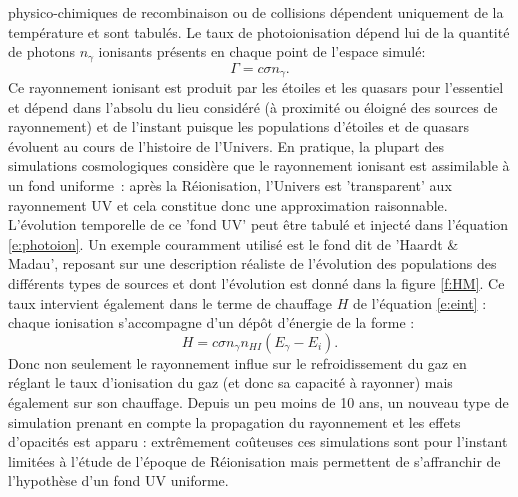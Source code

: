 physico-chimiques de recombinaison ou de collisions dépendent uniquement de la température et sont tabulés. Le taux de photoionisation dépend lui de la quantité de photons $n_\gamma$ ionisants présents en chaque point de l'espace simulé:
\begin{equation}
\Gamma=c\sigma n_\gamma.
\label{e:photoion}
\end{equation}
Ce rayonnement ionisant est produit par les étoiles et les quasars pour l'essentiel et dépend dans l'absolu du lieu considéré (à proximité ou éloigné des sources de rayonnement) et de l'instant puisque les populations d'étoiles et de quasars évoluent au cours de l'histoire de l'Univers. En pratique, la plupart des simulations cosmologiques considère que le rayonnement ionisant est assimilable à un fond uniforme~: après la Réionisation, l'Univers est 'transparent' aux rayonnement UV et cela constitue donc une approximation raisonnable. L'évolution temporelle de ce 'fond UV' peut être tabulé et injecté dans l'équation \ref{e:photoion}. Un exemple couramment utilisé est le fond dit de 'Haardt \& Madau', reposant sur une description réaliste de l'évolution des populations des différents types de sources et dont l'évolution est donné dans la figure \ref{f:HM}. Ce taux intervient également dans le terme de chauffage $H$ de l'équation \ref{e:eint} : chaque ionisation s'accompagne d'un dépôt d'énergie de la forme :
\begin{equation}
H=c \sigma n_\gamma n_{HI} (E_\gamma-E_i).
\end{equation}
Donc non seulement le rayonnement influe sur le refroidissement du gaz en réglant le taux d'ionisation du gaz (et donc sa capacité à rayonner) mais également sur son chauffage. Depuis un peu moins de 10 ans, un nouveau type de simulation prenant en compte la propagation du rayonnement et les effets d'opacités  est apparu : extrêmement coûteuses ces simulations sont pour l'instant limitées à l'étude de l'époque de Réionisation mais permettent de s'affranchir de l'hypothèse d'un fond UV uniforme. 

